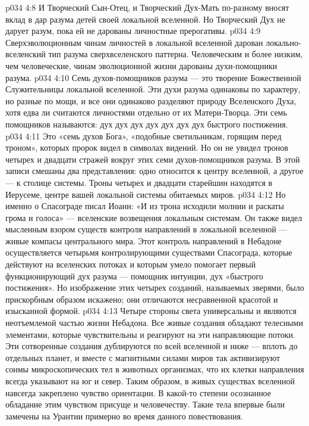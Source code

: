 \vs p034 4:8 \pc И Творческий Сын\hyp{}Отец, и Творческий Дух\hyp{}Мать по\hyp{}разному вносят вклад в дар разума детей своей локальной вселенной. Но Творческий Дух не дарует разум, пока ей не дарованы личностные прерогативы.
\vs p034 4:9 Сверхэволюционным чинам личностей в локальной вселенной дарован локально\hyp{}вселенский тип разума сверхвселенского паттерна. Человеческим и более низким, чем человеческие, чинам эволюционной жизни дарованы духи\hyp{}помощники разума.
\vs p034 4:10 \pc Семь духов\hyp{}помощников разума --- это творение Божественной Служительницы локальной вселенной. Эти духи разума одинаковы по характеру, но разные по мощи, и все они одинаково разделяют природу Вселенского Духа, хотя едва ли считаются личностями отдельно от их Матери\hyp{}Творца. Эти семь помощников называются: дух  дух  дух  дух  дух  дух  дух  быстрого постижения.
\vs p034 4:11 \pc Это «семь духов Бога», «подобные светильникам, горящим перед троном», которых пророк видел в символах видений. Но он не увидел тронов четырех и двадцати стражей вокруг этих семи духов\hyp{}помощников разума. В этой записи смешаны два представления: одно относится к центру вселенной, а другое --- к столице системы. Троны четырех и двадцати старейшин находятся в Иерусеме, центре вашей локальной системы обитаемых миров.
\vs p034 4:12 Но именно о Спасограде писал Иоанн: «И из трона исходили молнии и раскаты грома и голоса» --- вселенские возвещения локальным системам. Он также видел мысленным взором существ контроля направлений в локальной вселенной --- живые компасы центрального мира. Этот контроль направлений в Небадоне осуществляется четырьмя контролирующими существами Спасограда, которые действуют на вселенских потоках и которым умело помогает первый функционирующий дух разума --- помощник интуиции, дух «быстрого постижения». Но изображение этих четырех созданий, называемых зверями, было прискорбным образом искажено; они отличаются несравненной красотой и изысканной формой.
\vs p034 4:13 Четыре стороны света универсальны и являются неотъемлемой частью жизни Небадона. Все живые создания обладают телесными элементами, которые чувствительны и реагируют на эти направляющие потоки. Эти сотворенные создания дублируются по всей вселенной и ниже --- вплоть до отдельных планет, и вместе с магнитными силами миров так активизируют сонмы микроскопических тел в животных организмах, что их клетки направления всегда указывают на юг и север. Таким образом, в живых существах вселенной навсегда закреплено чувство ориентации. В какой\hyp{}то степени осознанное обладание этим чувством присуще и человечеству. Такие тела впервые были замечены на Урантии примерно во время данного повествования.
